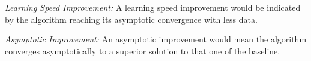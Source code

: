 
\noindent\textit{Learning Speed Improvement:}
A learning speed improvement would be indicated by the algorithm reaching its asymptotic convergence with less data.

\noindent\textit{Asymptotic Improvement:}
 An asymptotic improvement would mean the algorithm converges asymptotically to a superior solution to that one of the baseline.
 
